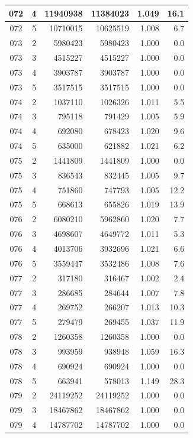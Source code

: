 \begin{longtable}{|c|r|r|r|r|r|}
\hline
072 & 4 & 11940938 & 11384023 & 1.049 & 16.1 \\
\hline
072 & 5 & 10710015 & 10625519 & 1.008 & 6.7 \\
\hline
073 & 2 & 5980423 & 5980423 & 1.000 & 0.0 \\
\hline
073 & 3 & 4515227 & 4515227 & 1.000 & 0.0 \\
\hline
073 & 4 & 3903787 & 3903787 & 1.000 & 0.0 \\
\hline
073 & 5 & 3517515 & 3517515 & 1.000 & 0.0 \\
\hline
074 & 2 & 1037110 & 1026326 & 1.011 & 5.5 \\
\hline
074 & 3 & 795118 & 791429 & 1.005 & 5.9 \\
\hline
074 & 4 & 692080 & 678423 & 1.020 & 9.6 \\
\hline
074 & 5 & 635000 & 621882 & 1.021 & 6.2 \\
\hline
075 & 2 & 1441809 & 1441809 & 1.000 & 0.0 \\
\hline
075 & 3 & 836543 & 832445 & 1.005 & 9.7 \\
\hline
075 & 4 & 751860 & 747793 & 1.005 & 12.2 \\
\hline
075 & 5 & 668613 & 655826 & 1.019 & 13.9 \\
\hline
076 & 2 & 6080210 & 5962860 & 1.020 & 7.7 \\
\hline
076 & 3 & 4698607 & 4649772 & 1.011 & 5.3 \\
\hline
076 & 4 & 4013706 & 3932696 & 1.021 & 6.6 \\
\hline
076 & 5 & 3559447 & 3532486 & 1.008 & 7.6 \\
\hline
077 & 2 & 317180 & 316467 & 1.002 & 2.4 \\
\hline
077 & 3 & 286685 & 284644 & 1.007 & 7.8 \\
\hline
077 & 4 & 269752 & 266207 & 1.013 & 10.3 \\
\hline
077 & 5 & 279479 & 269455 & 1.037 & 11.9 \\
\hline
078 & 2 & 1260358 & 1260358 & 1.000 & 0.0 \\
\hline
078 & 3 & 993959 & 938948 & 1.059 & 16.3 \\
\hline
078 & 4 & 690924 & 690924 & 1.000 & 0.0 \\
\hline
078 & 5 & 663941 & 578013 & 1.149 & 28.3 \\
\hline
079 & 2 & 24119252 & 24119252 & 1.000 & 0.0 \\
\hline
079 & 3 & 18467862 & 18467862 & 1.000 & 0.0 \\
\hline
079 & 4 & 14787702 & 14787702 & 1.000 & 0.0 \\

\end{longtable}
